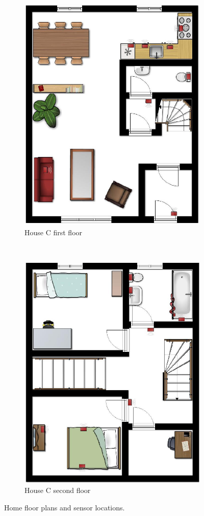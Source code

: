 \begin{figure}
	\\
	\begin{subfigure}[b]{0.25\textwidth}
		\includegraphics[height=\textwidth,angle=90]{fig/houseC1.png}
		\caption{House C first floor}
		\label{fig:houseC1}
	\end{subfigure}
	~
	\begin{subfigure}[b]{0.25\textwidth}
		\includegraphics[height=\textwidth,angle=90]{fig/houseC2.png}
		\caption{House C second floor}
		\label{fig:houseC2}
	\end{subfigure}
	\caption{Home floor plans and sensor locations.}\label{fig:houses}
\end{figure}


